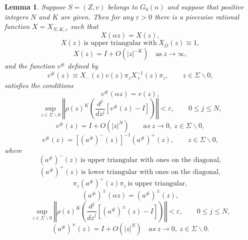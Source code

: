 \documentclass{surv-l}
\theoremstyle{plain}
\newtheorem{lem}[theorem]{Lemma}
\theoremstyle{definition}
\numberwithin{equation}{chapter}
\begin{document}
\begin{lem}\label{lem26.13}
Suppose $S=(Z, v)$ belongs to $G_{0}(n)$ and suppose that positive integers $N$ and $K$ are given. Then for  any $\varepsilon >0$ there is a piecewise rational function $X=X_{N,K,\varepsilon}$ such that
\setcounter{equation}{13}
\begin{equation}\label{eq26.14}
X(\alpha z)=X(z),
\end{equation}
\begin{equation}\label{eq26.15}
X(z)\ \text{is upper triangular with}\ X_{jj}(z)\equiv 1,
\end{equation}
\begin{equation}\label{eq26.16}
X(z)=I+O(|z|^{-K})\quad \mathrm{as}\ z\rightarrow\infty,
\end{equation}
and the function $ v^{\#}$ defined by
\begin{equation}\label{eq26.17}
v^{\#}(z)\equiv X_{-}(z)v(z)\pi_{z}X_{+}^{-1}(z)\pi_{z},\qquad z\in\Sigma\backslash 0,
\end{equation}
satisfies the conditions
\begin{equation}\label{eq26.18}
v^{\#}(\alpha z)=v(z),
\end{equation}
\begin{equation}\label{eq26.19}
\sup_{z\in\Sigma\backslash 0}\left\Vert\rho(z)^{K}\left(\frac{d^{j}}{dz^{j}}[v^{\#}(z)-I]\right)\right\Vert<\varepsilon, \qquad  0\leq j\leq N,
\end{equation}
\begin{equation}\label{eq26.20}
v^{\#}(z)=I+O(|z|^{N})\qquad as\ z\rightarrow 0, \ z\in\Sigma\backslash 0,
\end{equation}
\begin{equation}\label{eq26.21}
v^{\#}(z)=[(a^{\#})^{-}(z)]^{-1}(a^{\#})^{+}(z), \qquad z\in\Sigma\backslash 0,
\end{equation}
where
\begin{equation}\label{eq26.22}
(a^{\#})^{-}(z)\ \text{is upper triangular with ones on the diagonal},
\end{equation}
\begin{equation}\label{eq26.23}
(a^{\#})^{+}(z)\ \text{is lower triangular with ones on the diagonal},
\end{equation}
\begin{equation}\label{eq26.24}
\pi_{z}(a^{\#})^{+}(z)\pi_{z}\ \text{is upper triangular},
\end{equation}
\begin{equation}\label{eq26.25}
(a^{\#})^{\pm}(\alpha z)=(a^{\#})^{\pm}(z),
\end{equation}
\begin{equation}\label{eq26.26}
\sup_{z\in\Sigma\backslash 0}\left\Vert\rho(z)^{K}\left(\frac{d^{j}}{{dz}^{j}}[(a^{\#})^{\pm}(z)-I]\right)\right\Vert<\varepsilon,\qquad 0\leq j\leq N,
\end{equation}
\begin{equation}\label{eq26.27}
(a^{\#})^{\pm}(z)=I+O(|z|^{N})\quad as\ z\rightarrow 0,\ z\in\Sigma\backslash 0.
\end{equation}
\end{lem}
\end{document}
